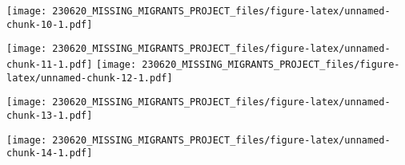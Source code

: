 \documentclass[
]{article}
\begin{document}
\texttt{[image: 230620\_MISSING\_MIGRANTS\_PROJECT\_files/figure-latex/unnamed-chunk-10-1.pdf]}

\texttt{[image: 230620\_MISSING\_MIGRANTS\_PROJECT\_files/figure-latex/unnamed-chunk-11-1.pdf]}
\texttt{[image: 230620\_MISSING\_MIGRANTS\_PROJECT\_files/figure-latex/unnamed-chunk-12-1.pdf]}

\texttt{[image: 230620\_MISSING\_MIGRANTS\_PROJECT\_files/figure-latex/unnamed-chunk-13-1.pdf]}

\texttt{[image: 230620\_MISSING\_MIGRANTS\_PROJECT\_files/figure-latex/unnamed-chunk-14-1.pdf]}
\end{document}

